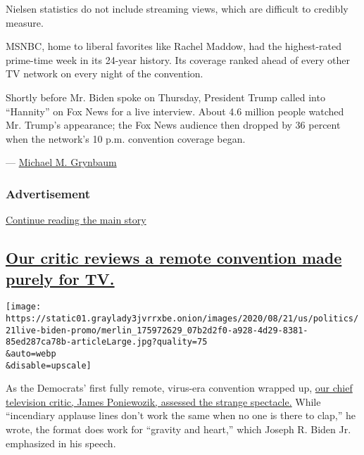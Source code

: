 Nielsen statistics do not include streaming views, which are difficult
to credibly measure.

MSNBC, home to liberal favorites like Rachel Maddow, had the
highest-rated prime-time week in its 24-year history. Its coverage
ranked ahead of every other TV network on every night of the convention.

Shortly before Mr. Biden spoke on Thursday, President Trump called into
``Hannity'' on Fox News for a live interview. About 4.6 million people
watched Mr. Trump's appearance; the Fox News audience then dropped by 36
percent when the network's 10 p.m. convention coverage began.

---
\href{https://www.nytimes3xbfgragh.onion/by/michael-m-grynbaum}{Michael
M. Grynbaum}

\hypertarget{advertisement-1}{%
\subsubsection{Advertisement}\label{advertisement-1}}

\protect\hyperlink{after-dfp-ad-mid2}{Continue reading the main story}

\hypertarget{our-critic-reviews-a-remote-convention-made-purely-for-tv}{%
\subsection{\texorpdfstring{\protect\hyperlink{our-critic-reviews-a-remote-convention-made-purely-for-tv}{Our
critic reviews a remote convention made purely for
TV.}}{Our critic reviews a remote convention made purely for TV.}}\label{our-critic-reviews-a-remote-convention-made-purely-for-tv}}

\texttt{[image: https://static01.graylady3jvrrxbe.onion/images/2020/08/21/us/politics/21live-biden-promo/merlin\_175972629\_07b2d2f0-a928-4d29-8381-85ed287ca78b-articleLarge.jpg?quality=75\\\&auto=webp\\\&disable=upscale]}

As the Democrats' first fully remote, virus-era convention wrapped up,
\href{https://www.nytimes3xbfgragh.onion/2020/08/21/arts/television/dnc-joe-biden.html}{our
chief television critic, James Poniewozik, assessed the strange
spectacle.} While ``incendiary applause lines don't work the same when
no one is there to clap,'' he wrote, the format does work for ``gravity
and heart,'' which Joseph R. Biden Jr. emphasized in his speech.

